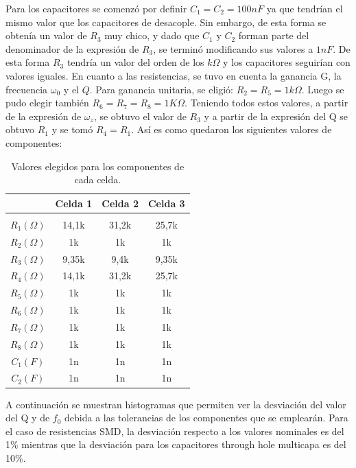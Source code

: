 Para los capacitores se comenz\'o por definir $C_1 = C_2 = 100nF$ ya que tendr\'ian el mismo valor que los capacitores de desacople. Sin embargo, de esta forma se obten\'ia un valor de $R_3$ muy chico, y dado que $C_1$ y $C_2$ forman parte del denominador de la expresi\'on de $R_3$, se termin\'o modificando sus valores a $1nF$. De esta forma $R_3$ tendr\'ia un valor del orden de los $k\Omega$ y los capacitores seguir\'ian con valores iguales.
En cuanto a las resistencias, se tuvo en cuenta la ganancia G, la frecuencia $\omega_0$ y el $Q$. Para ganancia unitaria, se eligi\'o: $R_2 = R_5 = 1k\Omega$. Luego se pudo elegir tambi\'en $R_6 = R_7 = R_8 = 1K\Omega$. Teniendo todos estos valores, a partir de la expresi\'on de $\omega_z$, se obtuvo el valor de $R_3$ y a partir de la expresi\'on del Q se obtuvo $R_1$ y se tom\'o $R_4 = R_1$. As\'i es como quedaron los siguientes valores de componentes:

\begin{table}[H] %
	\centering
	\begin{tabular}{c c c c}
		 & Celda 1& Celda 2 & Celda 3 \\
		\hline \\
		$R_1 (\Omega)$ & 14,1k & 31,2k& 25,7k \\
		$R_2 (\Omega)$ & 1k&1k &1k \\
		$R_3 (\Omega)$ & 9,35k & 9,4k& 9,35k \\
		$R_4 (\Omega)$ &14,1k  &31,2k & 25,7k\\
		$R_5 (\Omega)$ &1k & 1k&1k \\
		$R_6 (\Omega)$ & 1k& 1k&1k \\
		$R_7 (\Omega)$ & 1k&1k &1k \\
		$R_8 (\Omega)$ & 1k& 1k&1k \\
		$C_1 (F)$ & 1n&1n &1n \\
		$C_2 (F)$ & 1n&1n &1n \\
		\hline
	\end{tabular}
	\caption{Valores elegidos para los componentes de cada celda.}
	\label{componentes}
\end{table}

A continuaci\'on se muestran histogramas que permiten ver la desviaci\'on del valor del Q y de $f_0$ debida a las tolerancias de los componentes que se emplear\'an. Para el caso de resistencias SMD, la desviaci\'on respecto a los valores nominales es del 1\% mientras que la desviaci\'on para los capacitores through hole multicapa es del 10\%.

